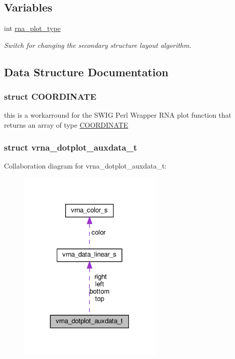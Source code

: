 \subsection*{Variables}
\begin{DoxyCompactItemize}
\item 
int \hyperlink{group__plotting__utils_ga5964c4581431b098b80027d6e14dcdd4}{rna\+\_\+plot\+\_\+type}
\begin{DoxyCompactList}\small\item\em Switch for changing the secondary structure layout algorithm. \end{DoxyCompactList}\end{DoxyCompactItemize}


\subsection{Data Structure Documentation}
\label{structCOORDINATE}
\subsubsection{struct C\+O\+O\+R\+D\+I\+N\+A\+TE}
this is a workarround for the S\+W\+IG Perl Wrapper R\+NA plot function that returns an array of type \hyperlink{group__plotting__utils_structCOORDINATE}{C\+O\+O\+R\+D\+I\+N\+A\+TE} \label{structvrna__dotplot__auxdata__t}
\subsubsection{struct vrna\+\_\+dotplot\+\_\+auxdata\+\_\+t}


Collaboration diagram for vrna\+\_\+dotplot\+\_\+auxdata\+\_\+t\+:
\nopagebreak
\begin{figure}[H]
\begin{center}
\leavevmode
\includegraphics[width=198pt]{structvrna__dotplot__auxdata__t__coll__graph}
\end{center}
\end{figure}


